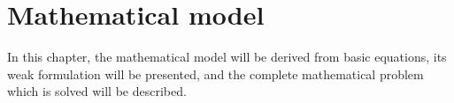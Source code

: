 \chapter{Mathematical model}
In this chapter, the mathematical model will be derived from basic equations, its weak formulation will be presented, and the complete mathematical problem which is solved will be described.




